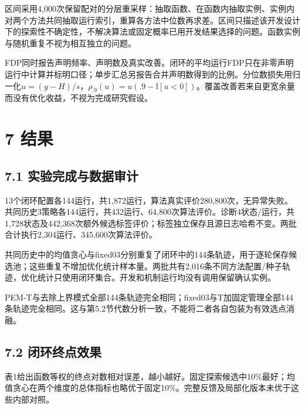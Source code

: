 \documentclass[11pt,a4paper]{article}
\begin{document}
区间采用4,000次保留配对的分层重采样：抽取函数、在函数内抽取实例、实例内对两个方法共同抽取运行索引，重算各方法中位数再求差。区间只描述该开发设计下的探索性不确定性，不解决算法或固定概率已用开发结果选择的问题。函数实例与随机重复不视为相互独立的问题。

FDP同时报告声明频率、声明数及真实改善。闭环的平均运行FDP只在非零声明运行中计算并标明口径；单步汇总另报告合并声明数得到的比例。分位数损失用归一化\(u=(y-H)/s\)，\(\rho_{.9}(u)=u(.9-\mathbb I[u<0])\)。覆盖改善若来自更宽余量而没有优化收益，不视为完成研究假设。

\hypertarget{ux7ed3ux679c}{%
\section{7 结果}\label{ux7ed3ux679c}}

\hypertarget{ux5b9eux9a8cux5b8cux6210ux4e0eux6570ux636eux5ba1ux8ba1}{%
\subsection{7.1
实验完成与数据审计}\label{ux5b9eux9a8cux5b8cux6210ux4e0eux6570ux636eux5ba1ux8ba1}}

13个闭环配置各144运行，共1,872运行，算法真实评价280,800次，无异常失败。共同历史3策略各144运行，共432运行、64,800次算法评价。诊断4状态/运行，共1,728状态及442,368次额外候选标签评价；标签独立保存且源日志哈希不变。两批合计执行2,304运行、345,600次算法评价。

共同历史中的均值贪心与fixed03分别重复了闭环中的144条轨迹，用于逐轮保存候选池；这些重复不增加优化统计样本量。两批共有2,016条不同方法配置/种子轨迹，优化统计只使用闭环集合。开发和机制运行均没有调用保留确认实例。

PEM-T与去除上界模式全部144条轨迹完全相同；fixed03与T加固定管理全部144条轨迹完全相同。这与第5.2节代数分析一致，不能将二者各自包装为有效选点消融。

\hypertarget{ux95edux73afux7ec8ux70b9ux6548ux679c}{%
\subsection{7.2
闭环终点效果}\label{ux95edux73afux7ec8ux70b9ux6548ux679c}}

表1给出函数等权的终点对数相对误差，越小越好。固定探索候选中10\%最好；均值贪心在两个维度的总体指标也略优于固定10\%。完整反馈及局部化版本未优于这些内部对照。
\end{document}
